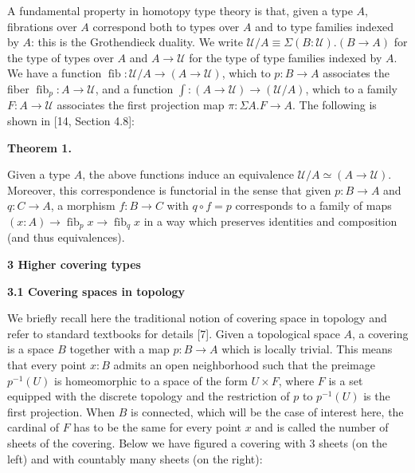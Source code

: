 \documentclass[10pt,a4paper]{article}
\begin{document}
 
A fundamental property in homotopy type theory is that, given a type $A$, fibrations over $A$ correspond both to types over $A$ and to type families indexed by $A$: this is the Grothendieck duality. We write $\mathcal{U}/A\equiv\Sigma(B:\mathcal{U}).(B\to A)$ for the type of types over $A$ and $A\to\mathcal{U}$ for the type of type families indexed by $A$. We have a function $\operatorname{fib}:\mathcal{U}/A\to(A\to\mathcal{U})$, which to $p:B\to A$ associates the fiber $\operatorname{fib}_{p}:A\to\mathcal{U}$, and a function $\int:(A\to\mathcal{U})\to(\mathcal{U}/A)$, which to a family $F:A\to\mathcal{U}$ associates the first projection map $\pi:\Sigma A.F\to A$. The following is shown in [14, Section 4.8]:\par
 
 
 
\par\medskip\noindent\textbf{Theorem 1.}\par
 
 
Given a type $A$, the above functions induce an equivalence $\mathcal{U}/A\simeq(A\to\mathcal{U})$. Moreover, this correspondence is functorial in the sense that given $p:B\to A$ and $q:C\to A$, a morphism $f:B\to C$ with $q\circ f=p$ corresponds to a family of maps $(x:A)\to\operatorname{fib}_{p}x\to\operatorname{fib}_{q}x$ in a way which preserves identities and composition (and thus equivalences).\par
 
 
 
 


 
\par\medskip\noindent\textbf{3 Higher covering types}\par
 
 
\par\medskip\noindent\textbf{3.1 Covering spaces in topology}\par
 
 
We briefly recall here the traditional notion of covering space in topology and refer to standard textbooks for details [7]. Given a topological space $A$, a covering is a space $B$ together with a map $p:B\to A$ which is locally trivial. This means that every point $x:B$ admits an open neighborhood such that the preimage $p^{-1}(U)$ is homeomorphic to a space of the form $U\times F$, where $F$ is a set equipped with the discrete topology and the restriction of $p$ to $p^{-1}(U)$ is the first projection. When $B$ is connected, which will be the case of interest here, the cardinal of $F$ has to be the same for every point $x$ and is called the number of sheets of the covering. Below we have figured a covering with 3 sheets (on the left) and with countably many sheets (on the right):\par
 
\end{document}
